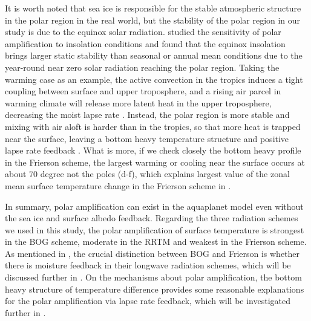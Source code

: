 It is worth noted that sea ice is responsible for the stable atmospheric structure in the polar region in the real world, but the stability of the polar region in our study is due to the equinox solar radiation. \cite{Kim2018} studied the sensitivity of polar amplification to insolation conditions and found that the equinox insolation brings larger static stability than seasonal or annual mean conditions due to the year-round near zero solar radiation reaching the polar region. Taking the warming case as an example, the active convection in the tropics induces a tight coupling between surface and upper troposphere, and a rising air parcel in warming climate will release more latent heat in the upper troposphere, decreasing the moist lapse rate \citep{Graversen2014}. Instead, the polar region is more stable and mixing with air aloft is harder than in the tropics, so that more heat is trapped near the surface, leaving a bottom heavy temperature structure and positive lapse rate feedback \citep{Pithan2014}. What is more, if we check closely the bottom heavy profile in the Frierson scheme, the largest warming or cooling near the surface occurs at about 70 degree not the poles (d-f), which explains largest value of the zonal mean surface temperature change in the Frierson scheme in .


In summary, polar amplification can exist in the aquaplanet model even without the sea ice and surface albedo feedback. Regarding the three radiation schemes we used in this study, the polar amplification of surface temperature is strongest in the BOG scheme, moderate in the RRTM and weakest in the Frierson scheme. As mentioned in , the crucial distinction between BOG and Frierson is whether there is moisture feedback in their longwave radiation schemes, which will be discussed further in . On the mechanisms about polar amplification, the bottom heavy structure of temperature difference provides some reasonable explanations for the polar amplification via lapse rate feedback, which will be investigated further in .

